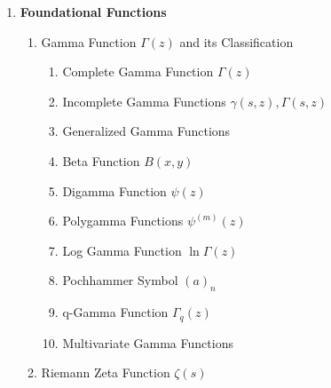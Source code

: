 \begin{enumerate}[label=\textbf{\arabic*.}]
	\item \textbf{Foundational Functions}
	\begin{enumerate}[label=\textbf{\alph*)}]
		\item Gamma Function $\Gamma(z)$ and its Classification
		\begin{enumerate}[label=\textbf{\roman*)}]
			\item Complete Gamma Function $\Gamma(z)$
			\item Incomplete Gamma Functions $\gamma(s,z), \Gamma(s,z)$
			\item Generalized Gamma Functions
			\item Beta Function $B(x,y)$
			\item Digamma Function $\psi(z)$
			\item Polygamma Functions $\psi^{(m)}(z)$
			\item Log Gamma Function $\ln \Gamma(z)$
			\item Pochhammer Symbol $(a)_n$
			\item q-Gamma Function $\Gamma_q(z)$
			\item Multivariate Gamma Functions
		\end{enumerate}
		\item Riemann Zeta Function $\zeta(s)$
	\end{enumerate}
	

\end{enumerate}
